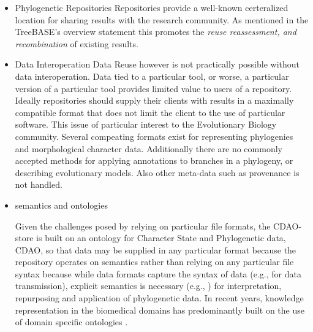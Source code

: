 \documentclass[10pt]{bmc_article}
\newenvironment{bmcformat}{\fussy\setboolean{publ}{true}}{\fussy}
\begin{document}
\begin{bmcformat}

\begin{itemize}
\item Phylogenetic Repositories %
  Repositories provide a well-known certeralized location for sharing results
  with the research community. As mentioned in the TreeBASE's overview statement
  this promotes the \textit{reuse reassessment, and recombination}\cite{treebase.org} of existing results.

\item Data Interoperation
   Data Reuse however is not practically possible without data interoperation. Data tied to
   a particular tool, or worse, a particular version of a particular tool provides limited
   value to users of a repository. Ideally repositories should supply their clients with
   results in a maximally compatible format that does not limit the client to the use of
   particular software. This issue of particular interest to the Evolutionary Biology
   community. Several compeating formats exist for representing phylogenies and morphological
   character data. Additionally there are no commonly accepted methods for applying annotations
   to branches in a phylogeny, or describing evolutionary models. Also other meta-data such
   as provenance is not handled.



\item semantics and ontologies


Given the challenges posed by relying on particular file formats, the CDAO-store is built on an
ontology for Character State and Phylogenetic data, CDAO, so that data may be supplied in
any particular format because the repository operates on semantics rather than relying on
any particular file syntax because while data formats capture the syntax of data 
(e.g., for data transmission), explicit  semantics is necessary (e.g., \cite{cdao-evol}) for interpretation, 
repurposing and application of phylogenetic data. In recent years, knowledge representation in 
the biomedical domains has predominantly built on the use of domain
specific ontologies \cite{SK02,Skl01}.


\end{itemize}
\end{bmcformat}
\end{document}
